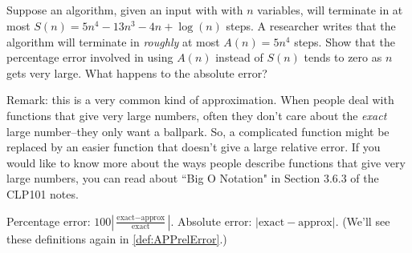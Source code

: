 \subsection*{\Application}

\begin{question}
Suppose an algorithm, given an input with with $n$ variables, will terminate in at most $S(n)=5n^4-13n^3-4n+\log (n)$ steps. A researcher writes that the algorithm will terminate in \emph{roughly} at most $A(n)=5n^4$ steps. Show that the percentage error involved in using $A(n)$ instead of $S(n)$ tends to zero as $n$ gets very large. What happens to the absolute error?

\vspace{5mm}
Remark: this is a very common kind of approximation. When people deal with functions that give very large numbers, often they don't care about the \emph{exact} large number--they only want a ballpark. So, a complicated function might be replaced by an easier function that doesn't give a large relative error. If you would like to know more about the ways people describe functions that give very large numbers, you can read about ``Big O Notation" in Section 3.6.3 of the CLP101 notes.
\end{question}
\begin{hint} Percentage error: $100\left|\frac{\mbox{exact}-\mbox{approx}}{\mbox{exact}}\right|$. Absolute error: $|\mbox{exact}-\mbox{approx}|$. (We'll see these definitions again in \ref*{def:APPrelError}.)
\end{hint}
